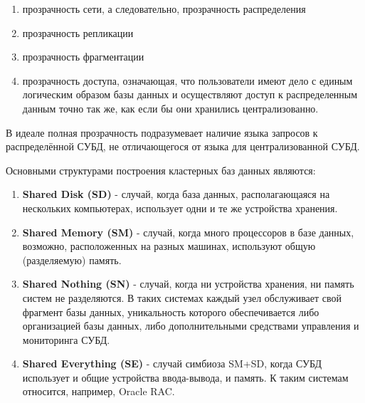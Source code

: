 \begin{enumerate}
	\item[\textbullet] прозрачность сети, а следовательно, прозрачность распределения
	\item[\textbullet] прозрачность репликации
	\item[\textbullet] прозрачность фрагментации
	\item[\textbullet] прозрачность доступа, означающая, что пользователи имеют дело с единым логическим образом базы данных и осуществляют доступ к распределенным данным точно так же, как если бы они хранились централизованно.
\end{enumerate}

В идеале полная прозрачность подразумевает наличие языка запросов к распределённой СУБД, не отличающегося от языка для централизованной СУБД.

\bigskip
Основными структурами построения кластерных баз данных являются:
\begin{enumerate}
	\item \textbf{Shared Disk (SD)} - случай, когда база данных, располагающаяся на нескольких компьютерах, использует одни и те же устройства хранения.
	
	\item \textbf{Shared Memory (SM)} - случай, когда много процессоров в базе данных, возможно, расположенных на разных машинах, используют общую (разделяемую) память.
	
	\item \textbf{Shared Nothing (SN)} - случай, когда ни устройства хранения, ни память систем не разделяются. В таких системах каждый узел обслуживает свой фрагмент базы данных, уникальность которого обеспечивается либо организацией базы данных, либо дополнительными средствами управления и мониторинга СУБД.
	
	\item \textbf{Shared Everything (SE)} - случай симбиоза SM+SD, когда СУБД использует и общие устройства ввода-вывода, и память. К таким системам относится, например, Oracle RAC.
\end{enumerate}

